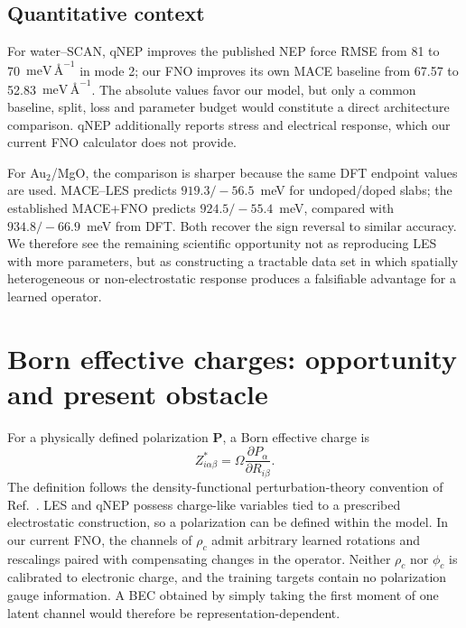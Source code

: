 \documentclass[11pt]{article}
\newcommand{\meva}{\ensuremath{\mathrm{meV\,\text{\AA}^{-1}}}}
\begin{document}
\subsection{Quantitative context}

For water--SCAN, qNEP improves the published NEP force RMSE from 81 to
70~\meva{} in mode 2; our FNO improves its own MACE baseline from 67.57 to
52.83~\meva. The absolute values favor our model, but only a common
baseline, split, loss and parameter budget would constitute a direct
architecture comparison. qNEP additionally reports stress and electrical
response, which our current FNO calculator does not provide.

For Au$_2$/MgO, the comparison is sharper because the same DFT endpoint values
are used. MACE--LES predicts \(919.3/-56.5\)~meV for undoped/doped slabs; the
established MACE+FNO predicts \(924.5/-55.4\)~meV, compared with
\(934.8/-66.9\)~meV from DFT. Both recover the sign reversal to similar
accuracy. We therefore see the remaining scientific opportunity not as
reproducing LES with more parameters, but as constructing a tractable data set
in which spatially heterogeneous or non-electrostatic response produces a
falsifiable advantage for a learned operator.

\section{Born effective charges: opportunity and present obstacle}

For a physically defined polarization \(\mathbf P\), a Born effective charge
is
\begin{equation}
 Z^{*}_{i\alpha\beta}
 =\Omega\frac{\partial P_\alpha}{\partial R_{i\beta}}.
\end{equation}
The definition follows the density-functional perturbation-theory convention
of Ref.~\citep{gonze1997bec}.
LES and qNEP possess charge-like variables tied to a prescribed electrostatic
construction, so a polarization can be defined within the model. In our
current FNO, the channels of \(\rho_c\) admit arbitrary learned rotations and
rescalings paired with compensating changes in the operator. Neither
\(\rho_c\) nor \(\phi_c\) is calibrated to electronic charge, and the training
targets contain no polarization gauge information. A BEC obtained by simply
taking the first moment of one latent channel would therefore be
representation-dependent.
\end{document}
